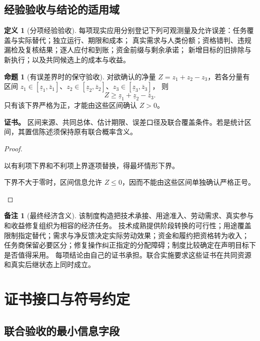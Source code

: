\documentclass[UTF8,12pt,a4paper,openany,fontset=none,zihao=false]{ctexrep}
\theoremstyle{definition}
\newtheorem{definition}{定义}[chapter]
\newtheorem{proposition}{命题}[chapter]
\newtheorem{remark}{备注}[chapter]
\newenvironment{certificate}{\par\noindent\textbf{证书。}\ignorespaces}{\par}
\newcommand{\1}{\mathbf 1}
\begin{document}
\section{经验验收与结论的适用域}

\begin{definition}[分项经验验收]
每项现实应用分别登记下列可观测量及允许误差：任务覆盖与实际替代；独立运行、期限和成本；
真实需求与人类份额；资格错判、违规漏检及复核结果；逐人应付和到账；资金前缀与剩余承诺；
新增目标的旧排除与新执行；以及共同候选上的成本与收益。
\end{definition}

\begin{proposition}[有误差界时的保守验收]
对欲确认的净量 \(Z=z_1+z_2-z_3\)，若各分量有区间
\(z_1\in[\underline z_1,\overline z_1]\)、\(z_2\in[\underline z_2,\overline z_2]\)、\(z_3\in[\underline z_3,\overline z_3]\)，
则
\[
Z\ge\underline z_1+\underline z_2-\overline z_3.
\]
只有该下界严格为正，才能由这些区间确认 \(Z>0\)。
\end{proposition}
\begin{certificate}
区间来源、共同总体、估计期限、误差口径及联合覆盖条件。若是统计区间，其置信陈述须保持原有联合概率含义。
\end{certificate}
\begin{proof}
\begin{semanticsteps}
\item 以有利项下界和不利项上界逐项替换，得最坏情形下界。
\item 下界不大于零时，区间信息允许 \(Z\le0\)，因而不能由这些区间单独确认严格正号。
\end{semanticsteps}
\end{proof}

\begin{remark}[最终经济含义]
该制度构造把技术承接、用途准入、劳动需求、真实参与和收益修复组织为相容的经济任务。
技术成熟提供阶段转换的可行性；用途覆盖限制指定替代；需求与净反馈决定实际劳动效果；资金和履约把资格转为收入；
任务商保留必要区分；修复操作纠正指定的分配障碍；制度比较确定在声明目标下是否值得采用。
每项结论由自己的证书承担。联合实施要求这些证书在共同资源和真实后继状态上同时成立。
\end{remark}

\appendix
\chapter{证书接口与符号约定}
\label{app:certificates}

\section{联合验收的最小信息字段}
\end{document}
